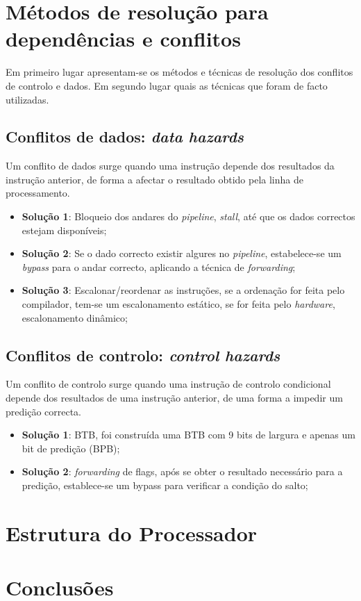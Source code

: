 \documentclass[11pt]{article}
\numberwithin{equation}{section}
\begin{document}
\section{Métodos de resolução para dependências e conflitos}

Em primeiro lugar apresentam-se os métodos e técnicas de resolução dos conflitos de controlo e dados. Em segundo lugar quais as técnicas que foram de facto utilizadas.

\subsection{Conflitos de dados: \textit{data hazards}}


Um conflito de dados surge quando uma instrução depende dos	resultados da instrução anterior, de forma a afectar o resultado obtido pela linha de processamento.

\begin{itemize}
	\item \textbf{Solução 1}: Bloqueio dos andares do \textit{pipeline}, \textit{stall}, até que os dados correctos estejam disponíveis;
	\item \textbf{Solução 2}: Se o dado correcto existir algures no \textit{pipeline}, estabelece-se um \textit{bypass} para o andar correcto, aplicando a técnica de \textit{forwarding};
	\vspace{-2.5mm}
	\item \textbf{Solução 3}: Escalonar/reordenar as instruções, se a ordenação for feita pelo compilador, tem-se um escalonamento estático, se for feita pelo \textit{hardware}, escalonamento dinâmico;
\end{itemize}

\subsection{Conflitos de controlo: \textit{control hazards}}

Um conflito de controlo surge quando uma instrução de controlo condicional depende dos resultados de uma instrução anterior, de uma forma a impedir um predição correcta. 

\begin{itemize}
	\item \textbf{Solução 1}: BTB, foi construída uma BTB com 9 bits de largura e apenas um bit de predição (BPB);
	\item \textbf{Solução 2}: \textit{forwarding} de flags, após se obter o resultado necessário para a predição, establece-se um bypass para verificar a condição do salto;
	\vspace{-2.5mm}
\end{itemize}


\section{Estrutura do Processador}

\section{Conclusões}

\pagebreak

\listoftodos
\end{document}
